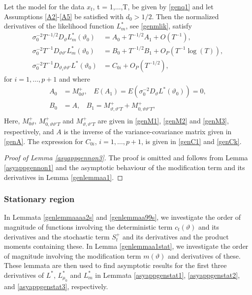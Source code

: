 {{\begin{lemma} \label{asyappgennon3}
Let the model for the data $x_t$, t = 1,$\ldots$,T, be given by \eqref{genq1} and let Assumptions \ref{A2}-\ref{A5} be satisfied with $d_0 > 1/2$. Then the normalized derivatives of the likelihood function $L_m^*$, see \eqref{genmlik}, satisfy
\begin{align}
    \sigma_0^{-2} T^{-1/2} D_{\vartheta} L_m^*(\vartheta_0)  &= A_{0} + T^{-1/2} A_{1} +O(T^{-1}), \\
    \sigma_0^{-2} T^{-1} D_{\vartheta \vartheta'} L_m^*(\vartheta_0)  &= B_{0} + T^{-1/2}  B_{1} + O_P(T^{-1} \log(T) ), \\
     \sigma_0^{-2} T^{-1} D_{\vartheta_i \vartheta \vartheta'} L^*(\vartheta_0)  &= C_{0i} + O_P(T^{-1/2}), 
\end{align}
for $i = 1,\ldots,p+1$ and where
\begin{align*}
A_{0} &= M_{0\vartheta}^{+}, \ \ \ \ E(A_{1}) = E(\sigma^{-2}_0 D_{\vartheta} L^*(\vartheta_0) ) = 0, \\
B_{0} &= A, \ \ \ \ B_1 = M_{\vartheta,\vartheta' T}^{+} + M_{0,\vartheta \vartheta' T}^{+}, \\
\end{align*}
Here,
$M_{0\vartheta}^{+}$, $M_{0,\vartheta \vartheta' T}^{+}$ and $M_{\vartheta,\vartheta' T}^{+}$ are given in \eqref{genM1}, \eqref{genM2} and \eqref{genM3}, respectively,
and $A$ is the inverse of the variance-covariance matrix given in \eqref{genA}. The expression for $C_{0i}$, $i = 1,\ldots,p+1$, is given in \eqref{genC1} and \eqref{genCk}.
\end{lemma}

\begin{proof}[Proof of Lemma \ref{asyappgennon3}]
The proof is omitted and follows from Lemma \ref{asyappgennon1} and the asymptotic behaviour of the modification term and its derivatives in Lemma \ref{genlemmaa1}. 
\end{proof}

\subsubsection{Stationary region}\label{genstat1}


In Lemmata \ref{genlemmaaaa2s} and \ref{genlemmaa99s}, we investigate the order of magnitude of functions involving the deterministic term $c_{t}(\vartheta)$ and its derivatives and the stochastic term $S^+_{t}$ and its derivatives and the product moments containing these. In Lemma \ref{genlemmaa1stat}, we investigate the order of magnitude involving the modification term $m(\vartheta)$ and derivatives of these. These lemmata are then used to find asymptotic results for the first three derivatives of $L^*$, $L^*_{\mu_0}$ and $L^*_{m}$ in Lemmata \ref{asyappgenstat1}, \ref{asyappgenstat2}, and \ref{asyappgenstat3}, respectively.

}}
